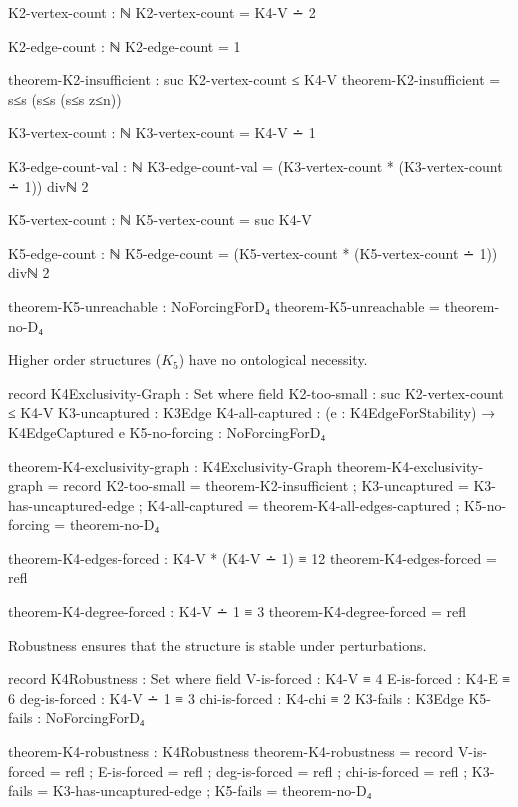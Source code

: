 \documentclass[11pt,a4paper]{book}
\begin{document}
\begin{code}
K2-vertex-count : ℕ
K2-vertex-count = K4-V ∸ 2

K2-edge-count : ℕ
K2-edge-count = 1

theorem-K2-insufficient : suc K2-vertex-count ≤ K4-V
theorem-K2-insufficient = s≤s (s≤s (s≤s z≤n))

K3-vertex-count : ℕ
K3-vertex-count = K4-V ∸ 1

K3-edge-count-val : ℕ
K3-edge-count-val = (K3-vertex-count * (K3-vertex-count ∸ 1)) divℕ 2

K5-vertex-count : ℕ
K5-vertex-count = suc K4-V

K5-edge-count : ℕ
K5-edge-count = (K5-vertex-count * (K5-vertex-count ∸ 1)) divℕ 2

theorem-K5-unreachable : NoForcingForD₄
theorem-K5-unreachable = theorem-no-D₄
\end{code}

Higher order structures ($K_5$) have no ontological necessity.

\begin{code}
record K4Exclusivity-Graph : Set where
  field
    K2-too-small    : suc K2-vertex-count ≤ K4-V
    K3-uncaptured   : K3Edge
    K4-all-captured : (e : K4EdgeForStability) → K4EdgeCaptured e
    K5-no-forcing   : NoForcingForD₄

theorem-K4-exclusivity-graph : K4Exclusivity-Graph
theorem-K4-exclusivity-graph = record
  { K2-too-small    = theorem-K2-insufficient
  ; K3-uncaptured   = K3-has-uncaptured-edge
  ; K4-all-captured = theorem-K4-all-edges-captured
  ; K5-no-forcing   = theorem-no-D₄
  }

\end{code}

\begin{code}
theorem-K4-edges-forced : K4-V * (K4-V ∸ 1) ≡ 12
theorem-K4-edges-forced = refl

theorem-K4-degree-forced : K4-V ∸ 1 ≡ 3
theorem-K4-degree-forced = refl
\end{code}

Robustness ensures that the structure is stable under perturbations.

\begin{code}
record K4Robustness : Set where
  field
    V-is-forced       : K4-V ≡ 4
    E-is-forced       : K4-E ≡ 6
    deg-is-forced     : K4-V ∸ 1 ≡ 3
    chi-is-forced     : K4-chi ≡ 2
    K3-fails          : K3Edge
    K5-fails          : NoForcingForD₄

theorem-K4-robustness : K4Robustness
theorem-K4-robustness = record
  { V-is-forced   = refl
  ; E-is-forced   = refl
  ; deg-is-forced = refl
  ; chi-is-forced = refl
  ; K3-fails      = K3-has-uncaptured-edge
  ; K5-fails      = theorem-no-D₄
  }
\end{code}
\end{document}

